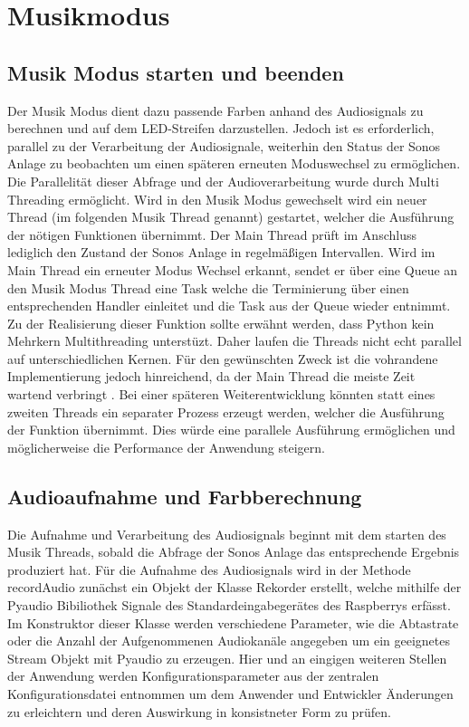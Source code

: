\section{Musikmodus}
\subsection{Musik Modus starten und beenden}
Der Musik Modus dient dazu passende Farben anhand des Audiosignals zu berechnen und auf dem LED-Streifen darzustellen. Jedoch ist es erforderlich, parallel zu der Verarbeitung
der Audiosignale, weiterhin den Status der Sonos Anlage zu beobachten um einen späteren erneuten Moduswechsel zu ermöglichen. Die Parallelität dieser Abfrage und der 
Audioverarbeitung wurde durch Multi Threading ermöglicht. Wird in den Musik Modus gewechselt wird ein neuer Thread (im folgenden Musik Thread genannt) gestartet,
welcher die Ausführung der nötigen Funktionen übernimmt. Der Main Thread prüft im Anschluss lediglich den Zustand der Sonos Anlage in regelmäßigen Intervallen. 
Wird im Main Thread ein erneuter Modus Wechsel erkannt, sendet er über eine Queue an den Musik Modus Thread eine Task welche die Terminierung über einen entsprechenden Handler
einleitet und die Task aus der Queue wieder entnimmt. Zu der Realisierung dieser Funktion sollte erwähnt werden, dass Python kein Mehrkern Multithreading unterstüzt. Daher
laufen die Threads nicht echt parallel auf unterschiedlichen Kernen. Für den gewünschten Zweck ist die vohrandene Implementierung jedoch hinreichend, da der Main Thread die meiste
Zeit wartend verbringt . Bei einer späteren Weiterentwicklung könnten statt eines zweiten Threads ein separater Prozess erzeugt werden, 
welcher die Ausführung der Funktion übernimmt. Dies würde eine parallele Ausführung ermöglichen und möglicherweise die Performance der Anwendung steigern.

\subsection{Audioaufnahme und Farbberechnung}
Die Aufnahme und Verarbeitung des Audiosignals beginnt mit dem starten des Musik Threads, sobald die Abfrage der Sonos Anlage das entsprechende Ergebnis produziert hat. 
Für die Aufnahme des Audiosignals wird in der Methode recordAudio zunächst ein Objekt der Klasse Rekorder erstellt, welche mithilfe der Pyaudio Bibiliothek 
Signale des Standardeingabegerätes des Raspberrys erfässt.
Im Konstruktor dieser Klasse werden verschiedene Parameter, wie die Abtastrate oder die Anzahl der Aufgenommenen Audiokanäle angegeben um ein geeignetes Stream Objekt
mit Pyaudio zu erzeugen. Hier und an eingigen weiteren Stellen der Anwendung werden Konfigurationsparameter aus der zentralen Konfigurationsdatei entnommen um dem Anwender 
und Entwickler Änderungen zu erleichtern und deren Auswirkung in konsistneter Form zu prüfen. \\

